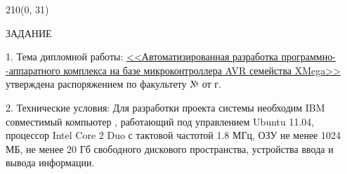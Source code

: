 \begin{textblock}{210}(0, 31)
\end{textblock}


\vspace{1.5em}

\begin{center}
	\MakeUppercase{Задание}
\end{center}

\begin{flushleft}
1. Тема дипломной работы: \underline{<<Автоматизированная разработка программно-}\\
\underline{-аппаратного комплекса на базе микроконтроллера AVR семейства XMega>>} \\
утверждена распоряжением по факультету № \underline{\makebox[22mm]{}} от \underline{\makebox[40mm]{}} г.\\
\end{flushleft}

\begin{flushleft}
2. Технические условия: Для разработки проекта системы необходим IBM совместимый компьютер
, работающий под управлением Ubuntu 11.04, процессор Intel Core 2 Duo с тактовой
частотой 1.8 МГц, ОЗУ не менее 1024 МБ, не менее 20 Гб свободного дискового пространства,
устройства ввода и вывода информации.
\end{flushleft}

